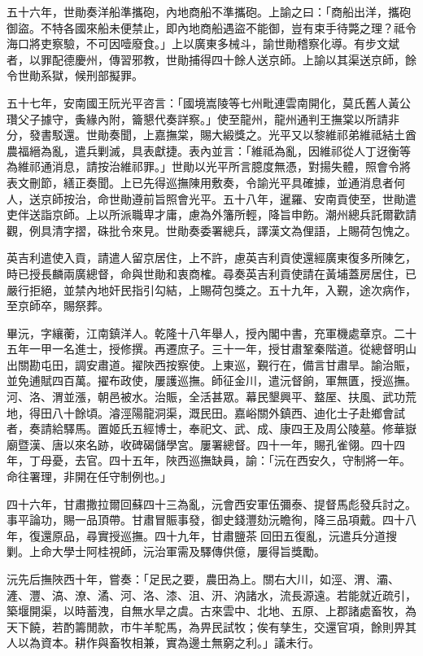 \begin{pinyinscope}
五十六年，世勛奏洋船準攜砲，內地商船不準攜砲。上諭之曰：「商船出洋，攜砲御盜。不特各國來船未便禁止，即內地商船遇盜不能御，豈有束手待斃之理？祗令海口將吏察驗，不可因噎廢食。」上以廣東多械斗，諭世勛稽察化導。有步文斌者，以罪配德慶州，傳習邪教，世勛捕得四十餘人送京師。上諭以其渠送京師，餘令世勛系獄，候刑部擬罪。

五十七年，安南國王阮光平咨言：「國境嵩陵等七州毗連雲南開化，莫氏舊人黃公瓚父子據守，夤緣內附，籥懇代奏詳察。」使至龍州，龍州通判王撫棠以所請非分，發書駁還。世勛奏聞，上嘉撫棠，賜大緞獎之。光平又以黎維祁弟維祗結土酋農福縉為亂，遣兵剿滅，具表獻捷。表內並言：「維祗為亂，因維祁從人丁迓衡等為維祁通消息，請按治維祁罪。」世勛以光平所言臆度無憑，對揚失體，照會令將表文刪節，繕正奏聞。上已先得巡撫陳用敷奏，令諭光平具確據，並通消息者何人，送京師按治，命世勛遵前旨照會光平。五十八年，暹羅、安南貢使至，世勛遣吏伴送詣京師。上以所派職卑才庸，慮為外籓所輕，降旨申飭。潮州總兵託爾歡請觀，例具清字摺，硃批令來見。世勛奏委署總兵，譯漢文為俚語，上賜荷包愧之。

英吉利遣使入貢，請遣人留京居住，上不許，慮英吉利貢使還經廣東復多所陳乞，時已授長麟兩廣總督，命與世勛和衷商榷。尋奏英吉利貢使請在黃埔蓋房居住，已嚴行拒絕，並禁內地奸民指引勾結，上賜荷包獎之。五十九年，入覲，途次病作，至京師卒，賜祭葬。

畢沅，字纕蘅，江南鎮洋人。乾隆十八年舉人，授內閣中書，充軍機處章京。二十五年一甲一名進士，授修撰。再遷庶子。三十一年，授甘肅鞏秦階道。從總督明山出關勘屯田，調安肅道。擢陜西按察使。上東巡，覲行在，備言甘肅旱。諭治賑，並免逋賦四百萬。擢布政使，屢護巡撫。師征金川，遣沅督餉，軍無匱，授巡撫。河、洛、渭並漲，朝邑被水。治賑，全活甚眾。幕民墾興平、盩厔、扶風、武功荒地，得田八十餘頃。濬涇陽龍洞渠，溉民田。嘉峪關外鎮西、迪化士子赴鄉會試者，奏請給驛馬。置姬氏五經博士，奉祀文、武、成、康四王及周公陵墓。修華嶽廟暨漢、唐以來名跡，收碑碣儲學宮。屢署總督。四十一年，賜孔雀翎。四十四年，丁母憂，去官。四十五年，陜西巡撫缺員，諭：「沅在西安久，守制將一年。命往署理，非開在任守制例也。」

四十六年，甘肅撒拉爾回蘇四十三為亂，沅會西安軍伍彌泰、提督馬彪發兵討之。事平論功，賜一品頂帶。甘肅冒賑事發，御史錢灃劾沅瞻徇，降三品項戴。四十八年，復還原品，尋實授巡撫。四十九年，甘肅鹽茶回田五復亂，沅遣兵分道搜剿。上命大學士阿桂視師，沅治軍需及驛傳供億，屢得旨獎勵。

沅先后撫陜西十年，嘗奏：「足民之要，農田為上。關右大川，如涇、渭、灞、滻、灃、滈、潦、潏、河、洛、漆、沮、汧、汭諸水，流長源遠。若能就近疏引，築堰開渠，以時蓄洩，自無水旱之虞。古來雲中、北地、五原、上郡諸處畜牧，為天下饒，若酌籌閒款，市牛羊駝馬，為畀民試牧；俟有孳生，交還官項，餘則畀其人以為資本。耕作與畜牧相兼，實為邊土無窮之利。」議未行。


\end{pinyinscope}
